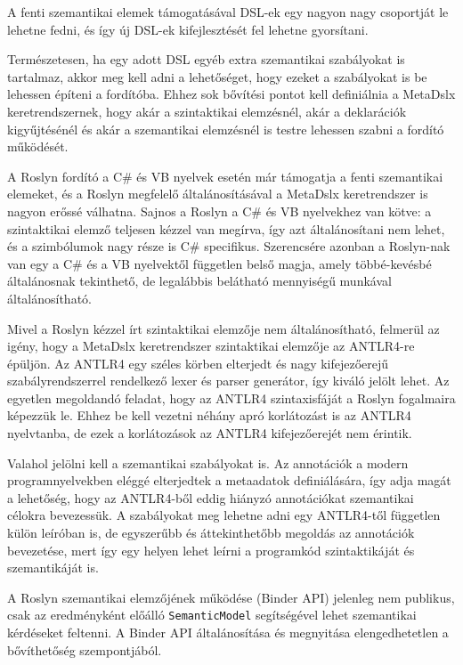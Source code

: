 \documentclass[12pt, a4paper]{report}
\newcommand{\f}[1]{\texttt{#1}}
\begin{document}
A fenti szemantikai elemek támogatásával DSL-ek egy nagyon nagy csoportját le lehetne fedni, és így új DSL-ek kifejlesztését fel lehetne gyorsítani.

Természetesen, ha egy adott DSL egyéb extra szemantikai szabályokat is tartalmaz, akkor meg kell adni a lehetőséget, hogy ezeket a szabályokat is be lehessen építeni a fordítóba. Ehhez sok bővítési pontot kell definiálnia a MetaDslx keretrendszernek, hogy akár a szintaktikai elemzésnél, akár a deklarációk kigyűjtésénél és akár a szemantikai elemzésnél is testre lehessen szabni a fordító működését.

A Roslyn fordító a C\# és VB nyelvek esetén már támogatja a fenti szemantikai elemeket, és a Roslyn megfelelő általánosításával a MetaDslx keretrendszer is nagyon erőssé válhatna. Sajnos a Roslyn a C\# és VB nyelvekhez van kötve: a szintaktikai elemző teljesen kézzel van megírva, így azt általánosítani nem lehet, és a szimbólumok nagy része is C\# specifikus. Szerencsére azonban a Roslyn-nak van egy a C\# és a VB nyelvektől független belső magja, amely többé-kevésbé általánosnak tekinthető, de legalábbis belátható mennyiségű munkával általánosítható.

Mivel a Roslyn kézzel írt szintaktikai elemzője nem általánosítható, felmerül az igény, hogy a MetaDslx keretrendszer szintaktikai elemzője az ANTLR4-re épüljön. Az ANTLR4 egy széles körben elterjedt és nagy kifejezőerejű szabályrendszerrel rendelkező lexer és parser generátor, így kiváló jelölt lehet. Az egyetlen megoldandó feladat, hogy az ANTLR4 szintaxisfáját a Roslyn fogalmaira képezzük le. Ehhez be kell vezetni néhány apró korlátozást is az ANTLR4 nyelvtanba, de ezek a korlátozások az ANTLR4 kifejezőerejét nem érintik.

Valahol jelölni kell a szemantikai szabályokat is. Az annotációk a modern programnyelvekben eléggé elterjedtek a metaadatok definiálására, így adja magát a lehetőség, hogy az ANTLR4-ből eddig hiányzó annotációkat szemantikai célokra bevezessük. A szabályokat meg lehetne adni egy ANTLR4-től független külön leíróban is, de egyszerűbb és áttekinthetőbb megoldás az annotációk bevezetése, mert így egy helyen lehet leírni a programkód szintaktikáját és szemantikáját is.

A Roslyn szemantikai elemzőjének működése (Binder API) jelenleg nem publikus, csak az eredményként előálló \f{SemanticModel} segítségével lehet szemantikai kérdéseket feltenni. A Binder API általánosítása és megnyitása elengedhetetlen a bővíthetőség szempontjából.
\end{document}
